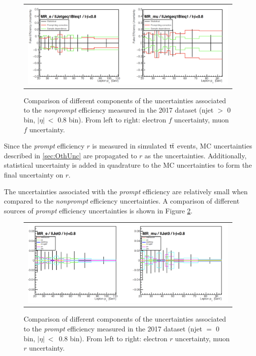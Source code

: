 \begin{figure}[tbh!]
 \begin{center}
 \begin{tabular}{c}
 \includegraphics[width=0.99\textwidth]{figures/Part3/Systematics/MR2}
 \end{tabular}
 \caption{Comparison of different components of the uncertainties associated to the \emph{nonprompt} efficiency measured in the 2017 dataset (njet $>$ 0 bin, $|\eta|~<$ 0.8 bin). From left to right: electron $f$ uncertainty, muon $f$ uncertainty.}
 \label{fig:f_comp2}
 \end{center}
\end{figure}

Since the \emph{prompt} efficiency $r$ is measured in simulated $\textsf{t}\overline{\textsf{t}}$ events, \ac{MC} uncertainties described in \autoref{sec:OthUnc} are propagated to $r$ as the uncertainties. Additionally, statistical uncertainty is added in quadrature to the \ac{MC} uncertainties to form the final uncertainty on $r$.

The uncertainties associated with the \emph{prompt} efficiency are relatively small when compared to the \emph{nonprompt} efficiency uncertainties. A comparison of different sources of \emph{prompt} efficiency uncertainties is shown in Figure \ref{fig:r_comp}.

\begin{figure}[tbh!]
 \begin{center}
 \begin{tabular}{c}
 \includegraphics[width=0.99\textwidth]{figures/Part3/Systematics/MR}
 \end{tabular}
 \caption{Comparison of different components of the uncertainties associated to the \emph{prompt} efficiency measured in the 2017 dataset (njet $=$ 0 bin, $|\eta|~<$~0.8 bin). From left to right: electron $r$ uncertainty, muon $r$ uncertainty.}
 \label{fig:r_comp}
 \end{center}
\end{figure}

